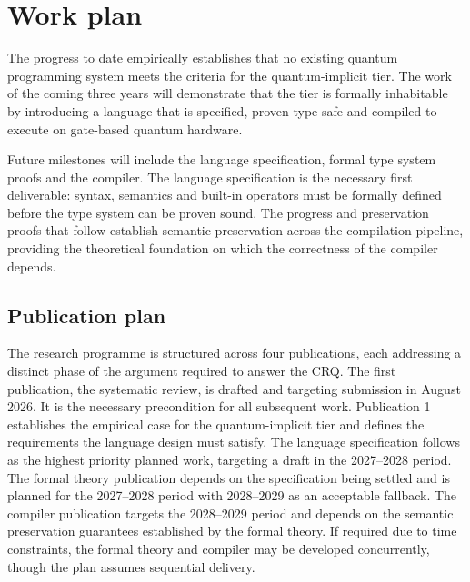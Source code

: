 \section{Work plan}\label{sec:pre_confirmation:work_plan}
The progress to date empirically establishes that no existing quantum programming system meets the criteria for the quantum-implicit tier.
The work of the coming three years will demonstrate that the tier is formally inhabitable by introducing a language that is specified, proven type-safe and compiled to execute on gate-based quantum hardware.

Future milestones will include the language specification, formal type system proofs and the compiler.
The language specification is the necessary first deliverable: syntax, semantics and built-in operators must be formally defined before the type system can be proven sound.
The progress and preservation proofs that follow establish semantic preservation across the compilation pipeline, providing the theoretical foundation on which the correctness of the compiler depends.

\subsection{Publication plan}\label{subsec:pre_confirmation:work_plan:publication_plan}
The research programme is structured across four publications, each addressing a distinct phase of the argument required to answer the CRQ.
The first publication, the systematic review, is drafted and targeting submission in August 2026.
It is the necessary precondition for all subsequent work.
Publication 1 establishes the empirical case for the quantum-implicit tier and defines the requirements the language design must satisfy.
The language specification follows as the highest priority planned work, targeting a draft in the 2027--2028 period.
The formal theory publication depends on the specification being settled and is planned for the 2027--2028 period with 2028--2029 as an acceptable fallback.
The compiler publication targets the 2028--2029 period and depends on the semantic preservation guarantees established by the formal theory.
If required due to time constraints, the formal theory and compiler may be developed concurrently, though the plan assumes sequential delivery.

